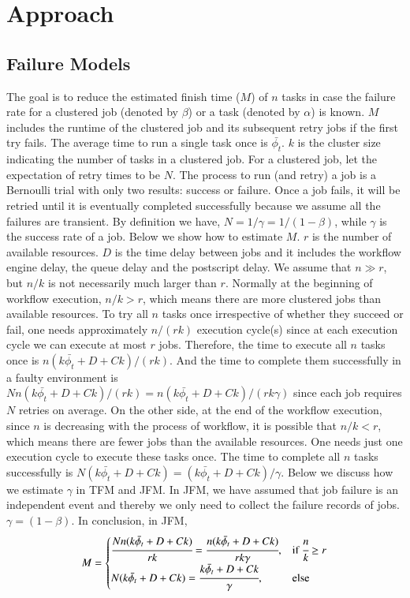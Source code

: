 \section{Approach}

\subsection{Failure Models}

The goal is to reduce the estimated finish time ($M$) of $n$ tasks in case the failure rate for a clustered job (denoted by $\beta$) or a task (denoted by $\alpha$) is known. $M$ includes the runtime of the clustered job and its subsequent retry jobs if the first try fails. The average time to run a single task once is $\bar{\phi_t}$. $k$ is the cluster size indicating the number of tasks in a clustered job. For a clustered job, let the expectation of retry times to be $N$. The process to run (and retry) a job is a Bernoulli trial with only two results: success or failure. Once a job fails, it will be retried until it is eventually completed successfully because we assume all the failures are transient. By definition we have, $N=1/\gamma=1/(1-\beta)$, while $\gamma$ is the success rate of a job.
Below we show how to estimate $M$. $r$ is the number of available resources. $D$ is the time delay between jobs and it includes the workflow engine delay, the queue delay and the postscript delay. We assume that $n\gg r$, but $n/k$ is not necessarily much larger than $r$. Normally at the beginning of workflow execution, $n/k > r$, which means there are more clustered jobs than available resources. To try all $n$ tasks once irrespective of whether they succeed or fail, one needs approximately $n/(rk)$ execution cycle(s) since at each execution cycle we can execute at most $r$ jobs. Therefore, the time to execute all $n$ tasks once is $n(k\bar{\phi_t}+D+Ck)/(rk)$. And the time to complete them successfully in a faulty environment is $Nn(k\bar{\phi_t}+D+Ck)/(rk)=n(k\bar{\phi_t}+D+Ck)/(rk\gamma)$ since each job requires $N$ retries on average.  
On the other side, at the end of the workflow execution, since $n$ is decreasing with the process of workflow, it is possible that $n/k < r$, which means there are fewer jobs than the available resources. One needs just one execution cycle to execute these tasks once. The time to complete all $n$ tasks successfully is $N(k\bar{\phi_t}+D+Ck)=(k\bar{\phi_t}+D+Ck)/\gamma$. 
Below we discuss how we estimate $\gamma$ in TFM and JFM. In JFM, we have assumed that job failure is an independent event and thereby we only need to collect the failure records of jobs. $\gamma=(1-\beta)$. In conclusion, in JFM, 
\begin{equation} 
\label{eq:jfm}
M=
\begin{cases}
\cfrac{Nn(k\bar{\phi_t}+D+Ck)}{rk}=\cfrac{n(k\bar{\phi_t}+D+Ck)}{rk\gamma}, & \text{if } \cfrac{n}{k}\geq r \\
N(k\bar{\phi_t}+D+Ck)=\cfrac{k\bar{\phi_t}+D+Ck}{\gamma}, & \text{else}
\end{cases}
\end{equation}


